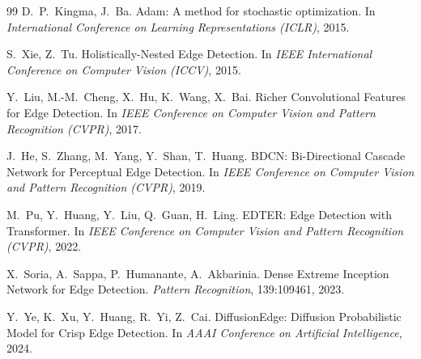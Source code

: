 \documentclass[11pt,a4paper]{article}
\begin{document}
\begin{thebibliography}{99}
D.~P.~Kingma, J.~Ba.
\newblock Adam: A method for stochastic optimization.
\newblock In \emph{International Conference on Learning Representations (ICLR)}, 2015.

S.~Xie, Z.~Tu.
\newblock Holistically-Nested Edge Detection.
\newblock In \emph{IEEE International Conference on Computer Vision (ICCV)}, 2015.

Y.~Liu, M.-M.~Cheng, X.~Hu, K.~Wang, X.~Bai.
\newblock Richer Convolutional Features for Edge Detection.
\newblock In \emph{IEEE Conference on Computer Vision and Pattern Recognition (CVPR)}, 2017.

J.~He, S.~Zhang, M.~Yang, Y.~Shan, T.~Huang.
\newblock BDCN: Bi-Directional Cascade Network for Perceptual Edge Detection.
\newblock In \emph{IEEE Conference on Computer Vision and Pattern Recognition (CVPR)}, 2019.

M.~Pu, Y.~Huang, Y.~Liu, Q.~Guan, H.~Ling.
\newblock EDTER: Edge Detection with Transformer.
\newblock In \emph{IEEE Conference on Computer Vision and Pattern Recognition (CVPR)}, 2022.

X.~Soria, A.~Sappa, P.~Humanante, A.~Akbarinia.
\newblock Dense Extreme Inception Network for Edge Detection.
\newblock \emph{Pattern Recognition}, 139:109461, 2023.

Y.~Ye, K.~Xu, Y.~Huang, R.~Yi, Z.~Cai.
\newblock DiffusionEdge: Diffusion Probabilistic Model for Crisp Edge Detection.
\newblock In \emph{AAAI Conference on Artificial Intelligence}, 2024.

\end{thebibliography}
\end{document}

